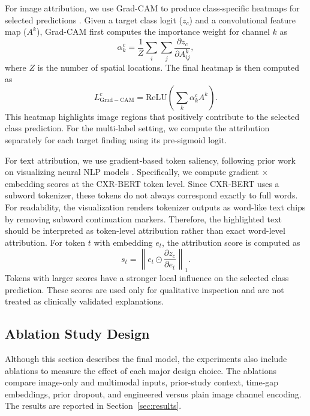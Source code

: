 For image attribution, we use Grad-CAM to produce class-specific heatmaps for selected predictions \cite{selvaraju2017gradcam}. Given a target class logit ($z_c$) and a convolutional feature map ($A^k$), Grad-CAM first computes the importance weight for channel $k$ as
\begin{equation}
    \alpha_k^c = \frac{1}{Z}\sum_i\sum_j \frac{\partial z_c}{\partial A_{ij}^k},
\end{equation}
where $Z$ is the number of spatial locations. The final heatmap is then computed as
\begin{equation}
    L_{\mathrm{Grad-CAM}}^c = \mathrm{ReLU}\left(\sum_k \alpha_k^c A^k\right).
\end{equation}
This heatmap highlights image regions that positively contribute to the selected class prediction. For the multi-label setting, we compute the attribution separately for each target finding using its pre-sigmoid logit.

For text attribution, we use gradient-based token saliency, following prior work on visualizing neural NLP models \cite{li2016visualizing_nlp}. Specifically, we compute gradient $\times$ embedding scores at the CXR-BERT token level. Since CXR-BERT uses a subword tokenizer, these tokens do not always correspond exactly to full words. For readability, the visualization renders tokenizer outputs as word-like text chips by removing subword continuation markers. Therefore, the highlighted text should be interpreted as token-level attribution rather than exact word-level attribution. For token $t$ with embedding $e_t$, the attribution score is computed as
\begin{equation}
    s_t = \left\| e_t \odot \frac{\partial z_c}{\partial e_t} \right\|_1.
\end{equation}
Tokens with larger scores have a stronger local influence on the selected class prediction. These scores are used only for qualitative inspection and are not treated as clinically validated explanations.

\subsection{Ablation Study Design}
\label{subsec:method_ablation_design}

Although this section describes the final model, the experiments also include ablations to measure the effect of each major design choice. The ablations compare image-only and multimodal inputs, prior-study context, time-gap embeddings, prior dropout, and engineered versus plain image channel encoding. The results are reported in Section~\ref{sec:results}.
